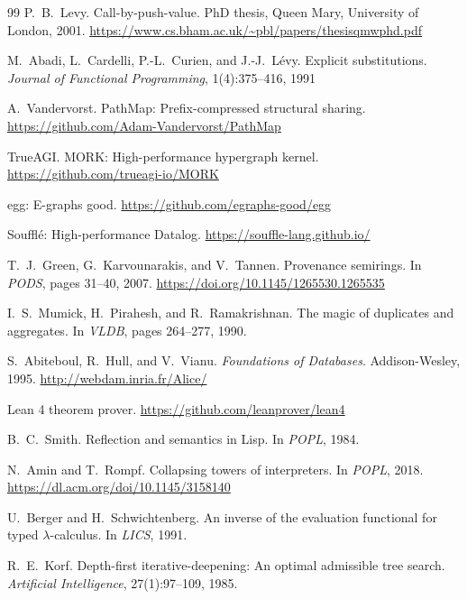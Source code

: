 \documentclass[11pt]{article}
\begin{document}
\begin{thebibliography}{99}
P.~B.~Levy.
\newblock Call-by-push-value.
\newblock PhD thesis, Queen Mary, University of London, 2001.
\newblock \url{https://www.cs.bham.ac.uk/~pbl/papers/thesisqmwphd.pdf}

M.~Abadi, L.~Cardelli, P.-L.~Curien, and J.-J.~L\'{e}vy.
\newblock Explicit substitutions.
\newblock \emph{Journal of Functional Programming}, 1(4):375--416, 1991

A.~Vandervorst.
\newblock PathMap: Prefix-compressed structural sharing.
\newblock \url{https://github.com/Adam-Vandervorst/PathMap}

TrueAGI.
\newblock MORK: High-performance hypergraph kernel.
\newblock \url{https://github.com/trueagi-io/MORK}

egg: E-graphs good.
\newblock \url{https://github.com/egraphs-good/egg}

Soufflé: High-performance Datalog.
\newblock \url{https://souffle-lang.github.io/}

T.~J.~Green, G.~Karvounarakis, and V.~Tannen.
\newblock Provenance semirings.
\newblock In \emph{PODS}, pages 31--40, 2007.
\newblock \url{https://doi.org/10.1145/1265530.1265535}

I.~S.~Mumick, H.~Pirahesh, and R.~Ramakrishnan.
\newblock The magic of duplicates and aggregates.
\newblock In \emph{VLDB}, pages 264--277, 1990.

S.~Abiteboul, R.~Hull, and V.~Vianu.
\newblock \emph{Foundations of Databases}.
\newblock Addison-Wesley, 1995.
\newblock \url{http://webdam.inria.fr/Alice/}

Lean 4 theorem prover.
\newblock \url{https://github.com/leanprover/lean4}

B.~C.~Smith.
\newblock Reflection and semantics in Lisp.
\newblock In \emph{POPL}, 1984.

N.~Amin and T.~Rompf.
\newblock Collapsing towers of interpreters.
\newblock In \emph{POPL}, 2018.
\newblock \url{https://dl.acm.org/doi/10.1145/3158140}

U.~Berger and H.~Schwichtenberg.
\newblock An inverse of the evaluation functional for typed $\lambda$-calculus.
\newblock In \emph{LICS}, 1991.

R.~E.~Korf.
\newblock Depth-first iterative-deepening: An optimal admissible tree search.
\newblock \emph{Artificial Intelligence}, 27(1):97--109, 1985.


\end{thebibliography}
\end{document}
